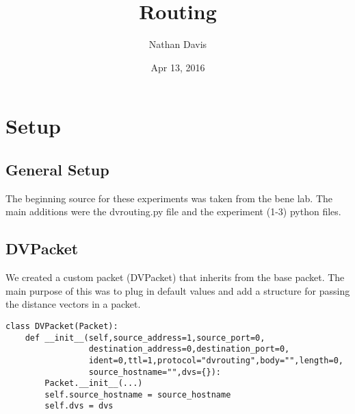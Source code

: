 \documentclass[11pt]{article}
\begin{document}
\lstset{
  language=Python,
  basicstyle=\small,          %
  keywordstyle=\bfseries,
  identifierstyle=,           %
  commentstyle=,              %
  stringstyle=\ttfamily,      %
  showstringspaces=false,     %
  numbers=left,
  numberstyle=\tiny,
  numbersep=5pt,
  frame=tb,
}

\title{Routing}

\author{Nathan Davis}

\date{Apr 13, 2016}

\maketitle

\section{Setup}

\subsection{General Setup}

The beginning source for these experiments was taken from the bene lab. The main additions were the dvrouting.py file and the experiment (1-3) python files.

\subsection{DVPacket}

We created a custom packet (DVPacket) that inherits from the base packet. The main purpose of this was to plug in default values and add a structure for passing the distance vectors in a packet.

\vspace{5mm}

\begin{lstlisting}
class DVPacket(Packet):
    def __init__(self,source_address=1,source_port=0,
                 destination_address=0,destination_port=0,
                 ident=0,ttl=1,protocol="dvrouting",body="",length=0,
                 source_hostname="",dvs={}):
        Packet.__init__(...)
        self.source_hostname = source_hostname
        self.dvs = dvs
\end{lstlisting}

\vspace{5mm}
\end{document}
